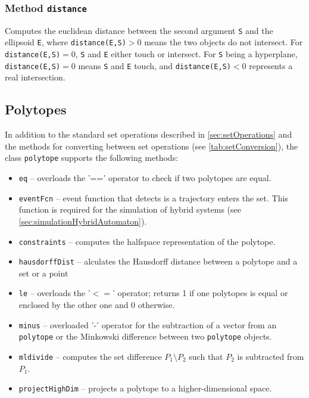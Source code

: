 \subsubsection{Method \texttt{distance}} \label{sec:ell_distance}

Computes the euclidean distance between the second argument \texttt{S} and the ellipsoid \texttt{E}, where \texttt{distance(E,S)}$>0$ means the two objects do not intersect. For \texttt{distance(E,S)}$=0$, \texttt{S} and \texttt{E} either touch or intersect. For \texttt{S} being a hyperplane, \texttt{distance(E,S)}$=0$ means \texttt{S} and \texttt{E} touch, and \texttt{distance(E,S)}$<0$ represents a real intersection.


\subsection{Polytopes}    \label{sec:polytopeOperations}

In addition to the standard set operations described in \cref{sec:setOperations} and the methods for converting between set operations (see \cref{tab:setConversion}), the class \texttt{polytope} supports the following methods:

\begin{itemize}
    \item \texttt{eq} -- overloads the '==' operator to check if two polytopes are equal.
    \item \texttt{eventFcn} -- event function that detects is a trajectory enters the set. This function is required for the simulation of hybrid systems (see \cref{sec:simulationHybridAutomaton}).
    \item \texttt{constraints} -- computes the halfspace representation of the polytope.
    \item \texttt{hausdorffDist} -- alculates the Hausdorff distance between a polytope and a set or a point
    \item \texttt{le} -- overloads the '$<=$' operator; returns 1 if one polytopes is equal or enclosed by the other one and 0 otherwise.
    \item \texttt{minus} -- overloaded '-' operator for the subtraction of a vector from an \texttt{polytope} or the Minkowski difference between two \texttt{polytope} objects.
    \item \texttt{mldivide} -- computes the set difference $P_1\setminus P_2$ such that $P_2$ is subtracted from $P_1$.
    \item \texttt{projectHighDim} -- projects a polytope to a higher-dimensional space.
\end{itemize}


